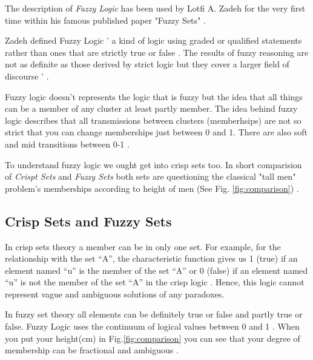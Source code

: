 

The description of \textit{Fuzzy Logic} has been used by Lotfi A. Zadeh for the very first time within his famous published paper "Fuzzy Sets" .

Zadeh defined Fuzzy Logic ' a kind of logic using graded or qualified statements rather than ones that are strictly true or false . The results of fuzzy reasoning are not as definite as those derived by strict logic but they cover a larger field of discourse ' \cite{lotfi}  .

Fuzzy logic doesn't represents the logic that is fuzzy but the idea that all things can be a member of any cluster at least partly member. The idea behind fuzzy logic describes that all transmissions between clusters (memberhsips) are not so strict that you can change memberships just between 0 and 1. There are also soft and mid transitions between 0-1 .

To understand fuzzy logic we ought get into crisp sets too. In short comparision of \textit{Crispt Sets}  and \textit{Fuzzy Sets} both sets are questioning the classical "tall men" problem's memberships according to height of men (See Fig. \ref{fig:comparison})   .

\subsection{Crisp Sets and Fuzzy Sets}

In crisp sets theory a member can be in only one set. For example, for the relationship with the set “A”, the characteristic function gives us 1 (true) if an element named “u” is the member of the set “A” or 0 (false) if an element named “u” is not the member of the set “A” in the crisp logic \cite{Kasabov:1996:FNN:525657}. Hence, this logic cannot represent vague and ambiguous solutions of any paradoxes.

In fuzzy set theory all elements can be definitely true or false and partly true or false. Fuzzy Logic uses the continuum of logical values between 0 and 1 . When you put your height(cm) in Fig.\ref{fig:comparison} you can see that your degree of membership can be fractional and ambiguous .


